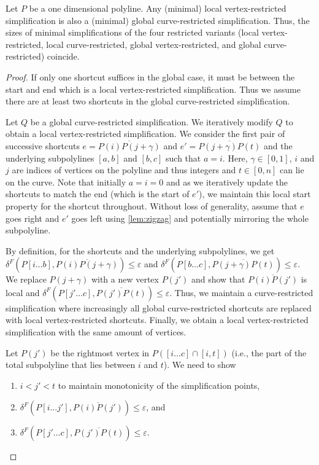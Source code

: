 \begin{theorem}\label{thm:restr_frechet_1}
	Let \(P\) be a one dimensional polyline. Any (minimal) local vertex-restricted simplification is also a (minimal) global curve-restricted simplification. Thus, the sizes of minimal simplifications of the four restricted variants (local vertex-restricted, local curve-restricted, global vertex-restricted, and global curve-restricted) coincide.
\end{theorem}

\begin{proof}
	If only one shortcut suffices in the global case, it must be between the start and end which is a local vertex-restricted simplification. Thus we assume there are at least two shortcuts in the global curve-restricted simplification.

	Let \(Q\) be a global curve-restricted simplification. We iteratively modify \(Q\) to obtain a local vertex-restricted simplification. We consider the first pair of successive shortcuts \(e = \overline{P(i)P(j + \gamma)}\) and \(e' = \overline{P(j+\gamma)P(t)}\) and the underlying subpolylines \([a, b]\) and \([b, c]\) such that \(a = i\). Here, \(\gamma \in [0, 1]\), \(i\) and \(j\) are indices of vertices on the polyline and thus integers and \(t \in [0, n]\) can lie on the curve. Note that initially \(a = i = 0\) and as we iteratively update the shortcuts to match the end (which is the start of \(e'\)), we maintain this local start property for the shortcut throughout. Without loss of generality, assume that \(e\) goes right and \(e'\) goes left using \cref{lem:zigzag} and potentially mirroring the whole subpolyline.

	By definition, for the shortcuts and the underlying subpolylines, we get \(\delta^F(P[i \dots b], \overline{P(i)P(j + \gamma)}) \leq \varepsilon\) and \(\delta^F(P[b \dots c], \overline{P(j+\gamma)P(t)}) \leq \varepsilon\). We replace \(P(j + \gamma)\) with a new vertex \(P(j')\) and show that \(\overline{P(i)P(j')}\) is local and \(\delta^F(P[j' \dots c], \overline{P(j')P(t)})  \leq \varepsilon\). Thus, we maintain a curve-restricted simplification where increasingly all global curve-restricted shortcuts are replaced with local vertex-restricted shortcuts. Finally, we obtain a local vertex-restricted simplification with the same amount of vertices.

	Let \(P(j')\) be the rightmost vertex in \(P([i \dots c] \cap [i, t])\) (i.e., the part of the total subpolyline that lies between \(i\) and \(t\)). We need to show 
	\begin{enumerate}
		\item \(i < j' < t\) to maintain monotonicity of the simplification points,
		\item \(\delta^F(P[i \dots j'], \overline{P(i)P(j')}) \leq \varepsilon\), and
		\item \(\delta^F(P[j' \dots c], \overline{P(j')P(t)}) \leq \varepsilon\).
	\end{enumerate}


\end{proof}
